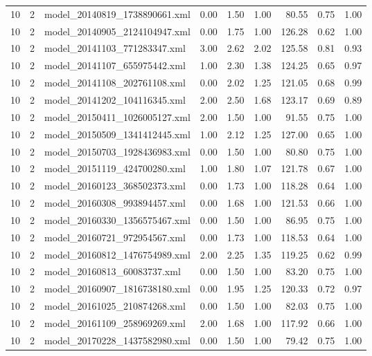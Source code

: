 \begin{table}[ht]
\begin{tabular}{rrlrrrrrr}
   10 &   2 & model\_20140819\_1738890661.xml & 0.00 & 1.50 & 1.00 & 80.55 & 0.75 & 1.00 \\ 
   10 &   2 & model\_20140905\_2124104947.xml & 0.00 & 1.75 & 1.00 & 126.28 & 0.62 & 1.00 \\ 
   10 &   2 & model\_20141103\_771283347.xml & 3.00 & 2.62 & 2.02 & 125.58 & 0.81 & 0.93 \\ 
   10 &   2 & model\_20141107\_655975442.xml & 1.00 & 2.30 & 1.38 & 124.25 & 0.65 & 0.97 \\ 
   10 &   2 & model\_20141108\_202761108.xml & 0.00 & 2.02 & 1.25 & 121.05 & 0.68 & 0.99 \\ 
   10 &   2 & model\_20141202\_104116345.xml & 2.00 & 2.50 & 1.68 & 123.17 & 0.69 & 0.89 \\ 
   10 &   2 & model\_20150411\_1026005127.xml & 2.00 & 1.50 & 1.00 & 91.55 & 0.75 & 1.00 \\ 
   10 &   2 & model\_20150509\_1341412445.xml & 1.00 & 2.12 & 1.25 & 127.00 & 0.65 & 1.00 \\ 
   10 &   2 & model\_20150703\_1928436983.xml & 0.00 & 1.50 & 1.00 & 80.80 & 0.75 & 1.00 \\ 
   10 &   2 & model\_20151119\_424700280.xml & 1.00 & 1.80 & 1.07 & 121.78 & 0.67 & 1.00 \\ 
   10 &   2 & model\_20160123\_368502373.xml & 0.00 & 1.73 & 1.00 & 118.28 & 0.64 & 1.00 \\ 
   10 &   2 & model\_20160308\_993894457.xml & 0.00 & 1.68 & 1.00 & 121.53 & 0.66 & 1.00 \\ 
   10 &   2 & model\_20160330\_1356575467.xml & 0.00 & 1.50 & 1.00 & 86.95 & 0.75 & 1.00 \\ 
   10 &   2 & model\_20160721\_972954567.xml & 0.00 & 1.73 & 1.00 & 118.53 & 0.64 & 1.00 \\ 
   10 &   2 & model\_20160812\_1476754989.xml & 2.00 & 2.25 & 1.35 & 119.25 & 0.62 & 0.99 \\ 
   10 &   2 & model\_20160813\_60083737.xml & 0.00 & 1.50 & 1.00 & 83.20 & 0.75 & 1.00 \\ 
   10 &   2 & model\_20160907\_1816738180.xml & 0.00 & 1.95 & 1.25 & 120.33 & 0.72 & 0.97 \\ 
   10 &   2 & model\_20161025\_210874268.xml & 0.00 & 1.50 & 1.00 & 82.03 & 0.75 & 1.00 \\ 
   10 &   2 & model\_20161109\_258969269.xml & 2.00 & 1.68 & 1.00 & 117.92 & 0.66 & 1.00 \\ 
   10 &   2 & model\_20170228\_1437582980.xml & 0.00 & 1.50 & 1.00 & 79.42 & 0.75 & 1.00 \\ 

\end{tabular}
\end{table}
